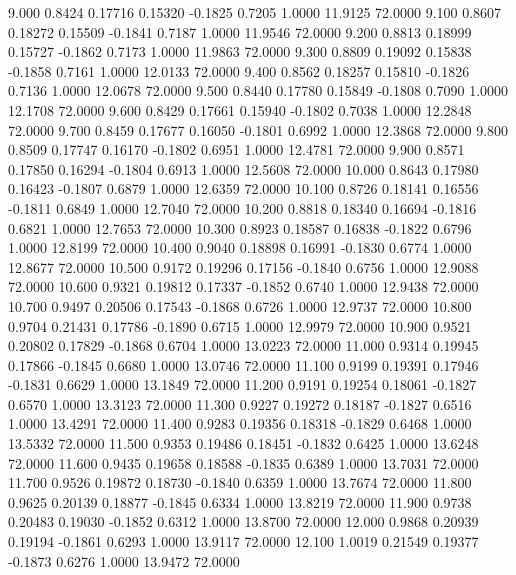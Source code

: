    9.000   0.8424   0.17716   0.15320  -0.1825   0.7205   1.0000  11.9125  72.0000
   9.100   0.8607   0.18272   0.15509  -0.1841   0.7187   1.0000  11.9546  72.0000
   9.200   0.8813   0.18999   0.15727  -0.1862   0.7173   1.0000  11.9863  72.0000
   9.300   0.8809   0.19092   0.15838  -0.1858   0.7161   1.0000  12.0133  72.0000
   9.400   0.8562   0.18257   0.15810  -0.1826   0.7136   1.0000  12.0678  72.0000
   9.500   0.8440   0.17780   0.15849  -0.1808   0.7090   1.0000  12.1708  72.0000
   9.600   0.8429   0.17661   0.15940  -0.1802   0.7038   1.0000  12.2848  72.0000
   9.700   0.8459   0.17677   0.16050  -0.1801   0.6992   1.0000  12.3868  72.0000
   9.800   0.8509   0.17747   0.16170  -0.1802   0.6951   1.0000  12.4781  72.0000
   9.900   0.8571   0.17850   0.16294  -0.1804   0.6913   1.0000  12.5608  72.0000
  10.000   0.8643   0.17980   0.16423  -0.1807   0.6879   1.0000  12.6359  72.0000
  10.100   0.8726   0.18141   0.16556  -0.1811   0.6849   1.0000  12.7040  72.0000
  10.200   0.8818   0.18340   0.16694  -0.1816   0.6821   1.0000  12.7653  72.0000
  10.300   0.8923   0.18587   0.16838  -0.1822   0.6796   1.0000  12.8199  72.0000
  10.400   0.9040   0.18898   0.16991  -0.1830   0.6774   1.0000  12.8677  72.0000
  10.500   0.9172   0.19296   0.17156  -0.1840   0.6756   1.0000  12.9088  72.0000
  10.600   0.9321   0.19812   0.17337  -0.1852   0.6740   1.0000  12.9438  72.0000
  10.700   0.9497   0.20506   0.17543  -0.1868   0.6726   1.0000  12.9737  72.0000
  10.800   0.9704   0.21431   0.17786  -0.1890   0.6715   1.0000  12.9979  72.0000
  10.900   0.9521   0.20802   0.17829  -0.1868   0.6704   1.0000  13.0223  72.0000
  11.000   0.9314   0.19945   0.17866  -0.1845   0.6680   1.0000  13.0746  72.0000
  11.100   0.9199   0.19391   0.17946  -0.1831   0.6629   1.0000  13.1849  72.0000
  11.200   0.9191   0.19254   0.18061  -0.1827   0.6570   1.0000  13.3123  72.0000
  11.300   0.9227   0.19272   0.18187  -0.1827   0.6516   1.0000  13.4291  72.0000
  11.400   0.9283   0.19356   0.18318  -0.1829   0.6468   1.0000  13.5332  72.0000
  11.500   0.9353   0.19486   0.18451  -0.1832   0.6425   1.0000  13.6248  72.0000
  11.600   0.9435   0.19658   0.18588  -0.1835   0.6389   1.0000  13.7031  72.0000
  11.700   0.9526   0.19872   0.18730  -0.1840   0.6359   1.0000  13.7674  72.0000
  11.800   0.9625   0.20139   0.18877  -0.1845   0.6334   1.0000  13.8219  72.0000
  11.900   0.9738   0.20483   0.19030  -0.1852   0.6312   1.0000  13.8700  72.0000
  12.000   0.9868   0.20939   0.19194  -0.1861   0.6293   1.0000  13.9117  72.0000
  12.100   1.0019   0.21549   0.19377  -0.1873   0.6276   1.0000  13.9472  72.0000
